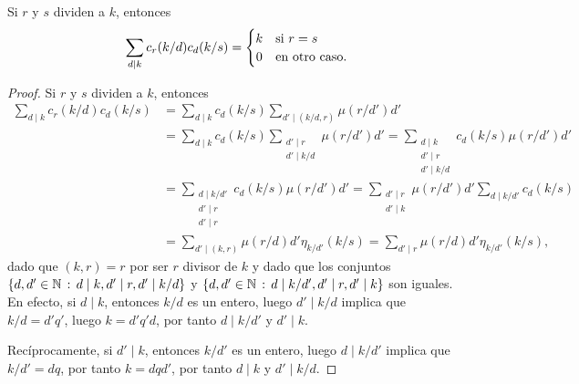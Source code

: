 \begin{lemma}
Si $r$ y $s$ dividen a $k$, entonces
\begin{equation*}
    \sum_{d \mid k} c_r(k/d) c_d(k/s) = \begin{cases}
        \hfil k & \text{si } r = s \\
        \hfil 0 & \text{en otro caso}.
    \end{cases}
\end{equation*}
\end{lemma}
\begin{proof}
Si $r$ y $s$ dividen a $k$, entonces
\begin{equation} \label{eq:ram2}
\begin{split}
\sum_{d \mid k} c_r (k/d) c_d (k/s) &= \sum_{d \mid k} c_d (k/s) \sum_{d' \mid (k/d,r)} \mu (r/d') d' \\
                                                                              &= \sum_{d \mid k} c_d (k/s) \sum_{\substack{d' \mid r \\ d' \mid k/d}} \mu(r/d') d' = \sum_{\substack{d \mid k \\ d' \mid r \\ d' \mid k/d}} c_d (k/s) \mu (r/d') d' \\
                                                                              &= \sum_{\substack{d \mid k/d' \\ d' \mid r \\ d' \mid r}} c_d(k/s) \mu(r/d')  d' = \sum_{\substack{d' \mid r \\ d' \mid k}} \mu(r/d') d' \sum_{d \mid k/d'} c_d(k/s) \\
                                                                              &= \sum_{d' \mid (k,r)} \mu(r/d) d' \eta_{k/d'} (k/s) = \sum_{d' \mid r} \mu(r/d) d' \eta_{k/d'} (k/s),
\end{split}
\end{equation}
dado que $(k,r)=r$ por ser $r$ divisor de $k$ y dado que los conjuntos $\{ d,d' \in \mathbb{N} \, : \, d \mid k, d' \mid r, d' \mid k/d \}$ y $\{ d,d' \in \mathbb{N} \, : \, d \mid k/d', d' \mid r, d' \mid k \}$ son iguales. En efecto, si $d \mid k$, entonces $k/d$ es un entero, luego $d' \mid k/d$ implica que $k/d=d' q'$, luego $k=d' q' d$, por tanto $d \mid k/d'$ y $d' \mid k$.
\bigskip

Recíprocamente, si $d' \mid k$, entonces $k/d'$ es un entero, luego $d \mid k/d'$ implica que $k/d'=dq$, por tanto $k=d q d'$, por tanto $d \mid k$ y $d' \mid k/d$.
\bigskip


\end{proof}
